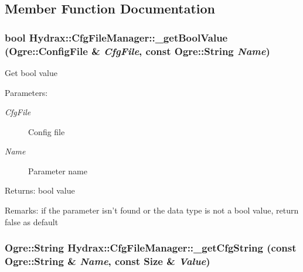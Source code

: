 \subsection{Member Function Documentation}
\hypertarget{class_hydrax_1_1_cfg_file_manager_a384e0c4c7444fbe2aea75a74ecc6c6c}{
\subsubsection[{\_\-getBoolValue}]{\setlength{\rightskip}{0pt plus 5cm}bool Hydrax::CfgFileManager::\_\-getBoolValue (Ogre::ConfigFile \& {\em CfgFile}, \/  const Ogre::String {\em Name})}}
\label{class_hydrax_1_1_cfg_file_manager_a384e0c4c7444fbe2aea75a74ecc6c6c}


Get bool value \begin{Desc}
\item[Parameters:]
\begin{description}
\item[{\em CfgFile}]Config file \item[{\em Name}]Parameter name \end{description}
\end{Desc}
\begin{Desc}
\item[Returns:]bool value \end{Desc}
\begin{Desc}
\item[Remarks:]if the parameter isn't found or the data type is not a bool value, return false as default \end{Desc}
\hypertarget{class_hydrax_1_1_cfg_file_manager_6b42513df69c7ec5ca81b73a82bd637c}{
\subsubsection[{\_\-getCfgString}]{\setlength{\rightskip}{0pt plus 5cm}Ogre::String Hydrax::CfgFileManager::\_\-getCfgString (const Ogre::String \& {\em Name}, \/  const {\bf Size} \& {\em Value})}}
\label{class_hydrax_1_1_cfg_file_manager_6b42513df69c7ec5ca81b73a82bd637c}


